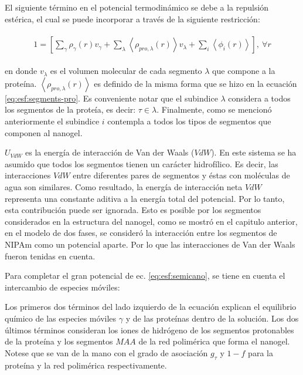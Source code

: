 El siguiente t\'ermino en el potencial termodin\'amico se debe a la repulsi\'on est\'erica, el cual se puede incorporar a trav\'es de la siguiente restricci\'on:

\begin{align}
	\begin{aligned}
		1=  {\left[\sum_{\gamma}\rho_\gamma(r) v_\gamma + \sum_\lambda{\left<\rho_{pro,\lambda}(r)\right>v_\lambda} + \sum_i{\left<\phi_i(r)\right>}\right]},~ \forall r
	\end{aligned}
	\label{eq:esf:constraint}
\end{align}


\noindent en donde $v_\lambda$  es el volumen molecular de cada segmento $\lambda$  que compone a la prote\'ina.
$\left<\rho_{pro,\lambda}(r)\right>$  es definido de la misma forma que se hizo en la ecuaci\'on \ref{eq:esf:segments-pro}.
Es conveniente notar que el subindice $\lambda$ considera a todos los segmentos de la prote\'ia, es decir: $ \tau \in \lambda$.
Finalmente, como se mencion\'o anteriormente el subindice $i$  contempla a todos los tipos de segmentos que componen al nanogel.



$U_{VdW}$ es la energ\'ia de interacci\'on de Van der Waals ($VdW$). En este sistema se ha asumido que todos los segmentos tienen un car\'acter hidrof\'ilico. Es decir, las interacciones $VdW$ entre diferentes pares de segmentos y \'estas con mol\'eculas de agua son similares. Como resultado, la energ\'ia de interacci\'on neta $VdW$ representa una constante aditiva a la energ\'ia total del potencial.
Por lo tanto, esta contribuci\'on puede ser ignorada. 
Esto es posible por los segmentos considerados en la estructura del nanogel, como se mostr\'o en el capitulo anterior, en el modelo de dos fases, se consider\'o la interacci\'on entre los segmentos de NIPAm como un potencial aparte. Por lo que las interacciones de Van der Waals fueron tenidas en cuenta.



Para completar el gran potencial de ec. \ref{eq:esf:semicano}, se tiene en cuenta el intercambio de especies m\'oviles:

Los primeros dos t\'erminos del lado izquierdo de la ecuaci\'on explican el equilibrio qu\'imico de las especies m\'oviles $\gamma$ y de las prote\'inas dentro de la soluci\'on.
Los dos \'ultimos t\'erminos consideran los iones de hidr\'ogeno de los segmentos protonables de la prote\'ina y los segmentos $MAA$ de la red polim\'erica que forma el nanogel. Notese que se van de la mano con el grado de asociaci\'on $g_\tau$ y $1-f$ para la prote\'ina y la red polim\'erica respectivamente. 


